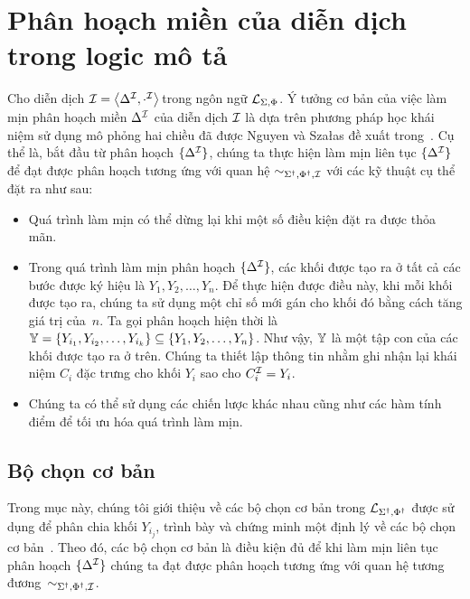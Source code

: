 \section{Phân hoạch miền của diễn dịch trong logic mô tả}

Cho diễn dịch $\mathcal{I} = \left\langle\Delta^{\mathcal{I}}, \cdot^{\mathcal{I}}\right\rangle\!$ trong ngôn ngữ $\mathcal{L}_{\Sigma,\Phi}$. Ý tưởng cơ bản của việc làm mịn phân hoạch miền $\Delta^{\mathcal{I}}$ của diễn dịch $\mathcal{I}$ là dựa trên phương pháp học khái niệm sử dụng mô phỏng hai chiều đã được Nguyen và Sza{\l}as đề xuất trong~\cite{Nguyen2013}. Cụ thể là, bắt đầu từ phân hoạch $\{\Delta^{\mathcal{I}}\}$, chúng ta thực hiện làm mịn liên tục $\{\Delta^{\mathcal{I}}\}$ để đạt được phân hoạch tương ứng với quan hệ $\sim_{\Sigma^\dag,\Phi^\dag,\mathcal{I}}$ với các kỹ thuật cụ thể đặt ra như sau:
\begin{itemize}
	\item Quá trình làm mịn có thể dừng lại khi một số điều kiện đặt ra được thỏa mãn.		
	\item Trong quá trình làm mịn phân hoạch $\{\Delta^{\mathcal{I}}\}$, các khối được tạo ra ở tất cả các bước được ký hiệu là $Y_1, Y_2, \ldots, Y_n$. Để thực hiện được điều này, khi mỗi khối được tạo ra, chúng ta sử dụng một chỉ số mới gán cho khối đó bằng cách tăng giá trị của~$n$. Ta gọi phân hoạch hiện thời là $\mathbb{Y} = \{Y_{i_1}, Y_{i_2}, \ldots, Y_{i_k}\} \subseteq \{Y_1, Y_2, \ldots, Y_n\}$. Như vậy, $\mathbb{Y}$ là một tập con của các khối được tạo ra ở trên. Chúng ta thiết lập thông tin nhằm ghi nhận lại khái niệm $C_i$ đặc trưng cho khối $Y_i$ sao cho $C_i^{\mathcal{I}} = Y_i$.
	\item Chúng ta có thể sử dụng các chiến lược khác nhau cũng như các hàm tính điểm để tối ưu hóa quá trình làm mịn.
\end{itemize}

\subsection{Bộ chọn cơ bản}
\label{sec:Chap3.BasicSelectors}
Trong mục này, chúng tôi giới thiệu về các bộ chọn cơ bản trong $\mathcal{L}_{\Sigma^\dag,\Phi^\dag}$ được sử dụng để phân chia khối $Y_{i_j}$, trình bày và chứng minh một định lý về các bộ chọn cơ bản~\cite{Tran2012}. Theo đó, các bộ chọn cơ bản là điều kiện đủ để khi làm mịn liên tục phân hoạch $\{\Delta^{\mathcal{I}}\}$ chúng ta đạt được phân hoạch tương ứng với quan hệ tương đương~$\sim_{\Sigma^\dag,\Phi^\dag,\mathcal{I}}$.
%

